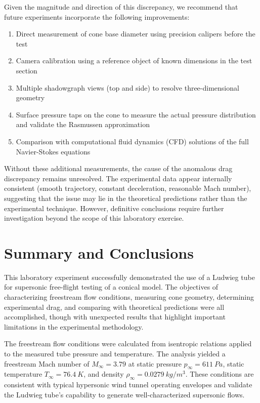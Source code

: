Given the magnitude and direction of this discrepancy, we recommend that future experiments incorporate the following improvements:

\begin{enumerate}
    \item Direct measurement of cone base diameter using precision calipers before the test
    \item Camera calibration using a reference object of known dimensions in the test section
    \item Multiple shadowgraph views (top and side) to resolve three-dimensional geometry
    \item Surface pressure taps on the cone to measure the actual pressure distribution and validate the Rasmussen approximation
    \item Comparison with computational fluid dynamics (CFD) solutions of the full Navier-Stokes equations
\end{enumerate}

Without these additional measurements, the cause of the anomalous drag discrepancy remains unresolved. The experimental data appear internally consistent (smooth trajectory, constant deceleration, reasonable Mach number), suggesting that the issue may lie in the theoretical predictions rather than the experimental technique. However, definitive conclusions require further investigation beyond the scope of this laboratory exercise.

\section{Summary and Conclusions} \label{sec:summary}

This laboratory experiment successfully demonstrated the use of a Ludwieg tube for supersonic free-flight testing of a conical model. The objectives of characterizing freestream flow conditions, measuring cone geometry, determining experimental drag, and comparing with theoretical predictions were all accomplished, though with unexpected results that highlight important limitations in the experimental methodology.

The freestream flow conditions were calculated from isentropic relations applied to the measured tube pressure and temperature. The analysis yielded a freestream Mach number of $M_\infty = 3.79$ at static pressure $p_\infty = \qty{611}{Pa}$, static temperature $T_\infty = \qty{76.4}{K}$, and density $\rho_\infty = \qty{0.0279}{kg/m^3}$. These conditions are consistent with typical hypersonic wind tunnel operating envelopes and validate the Ludwieg tube's capability to generate well-characterized supersonic flows.

